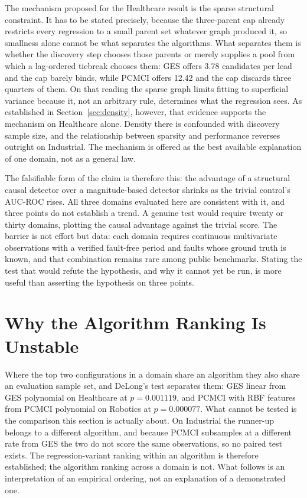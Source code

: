 The mechanism proposed for the Healthcare result is the sparse structural constraint. It has to be stated precisely, because the three-parent cap already restricts every regression to a small parent set whatever graph produced it, so smallness alone cannot be what separates the algorithms. What separates them is whether the discovery step chooses those parents or merely supplies a pool from which a lag-ordered tiebreak chooses them: GES offers 3.78 candidates per lead and the cap barely binds, while PCMCI offers 12.42 and the cap discards three quarters of them. On that reading the sparse graph limits fitting to superficial variance because it, not an arbitrary rule, determines what the regression sees. As established in Section~\ref{sec:density}, however, that evidence supports the mechanism on Healthcare alone. Density there is confounded with discovery sample size, and the relationship between sparsity and performance reverses outright on Industrial. The mechanism is offered as the best available explanation of one domain, not as a general law.

The falsifiable form of the claim is therefore this: the advantage of a structural causal detector over a magnitude-based detector shrinks as the trivial control's AUC-ROC rises. All three domains evaluated here are consistent with it, and three points do not establish a trend. A genuine test would require twenty or thirty domains, plotting the causal advantage against the trivial score. The barrier is not effort but data: each domain requires continuous multivariate observations with a verified fault-free period and faults whose ground truth is known, and that combination remains rare among public benchmarks. Stating the test that would refute the hypothesis, and why it cannot yet be run, is more useful than asserting the hypothesis on three points.

\section{Why the Algorithm Ranking Is Unstable}
\label{sec:disc-ranking}

Where the top two configurations in a domain share an algorithm they also share an evaluation sample set, and DeLong's test separates them: GES linear from GES polynomial on Healthcare at $p = 0.001119$, and PCMCI with RBF features from PCMCI polynomial on Robotics at $p = 0.000077$. What cannot be tested is the comparison this section is actually about. On Industrial the runner-up belongs to a different algorithm, and because PCMCI subsamples at a different rate from GES the two do not score the same observations, so no paired test exists. The regression-variant ranking within an algorithm is therefore established; the algorithm ranking across a domain is not. What follows is an interpretation of an empirical ordering, not an explanation of a demonstrated one.

